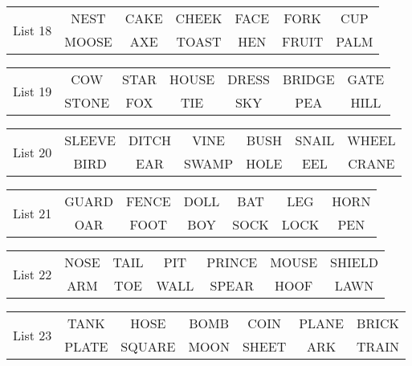\documentclass{article}
\begin{document}
\vspace{.1in}
\hspace{.5in}\begin{tabular}{r||c c c c c c }
\multirow{2}{*}{List 18} & NEST & CAKE & CHEEK & FACE & FORK & CUP\\
\cline{2-7}			& MOOSE & AXE & TOAST & HEN & FRUIT & PALM\\
\end{tabular}

\vspace{.1in}
\hspace{.5in}\begin{tabular}{r||c c c c c c }
\multirow{2}{*}{List 19} & COW & STAR & HOUSE & DRESS & BRIDGE & GATE\\
\cline{2-7}			& STONE & FOX & TIE & SKY & PEA & HILL\\
\end{tabular}

\vspace{.1in}
\hspace{.5in}\begin{tabular}{r||c c c c c c }
\multirow{2}{*}{List 20} & SLEEVE & DITCH & VINE & BUSH & SNAIL & WHEEL\\
\cline{2-7}			& BIRD & EAR & SWAMP & HOLE & EEL & CRANE\\
\end{tabular}

\vspace{.1in}
\hspace{.5in}\begin{tabular}{r||c c c c c c }
\multirow{2}{*}{List 21} & GUARD & FENCE & DOLL & BAT & LEG & HORN\\
\cline{2-7}			& OAR & FOOT & BOY & SOCK & LOCK & PEN\\
\end{tabular}

\vspace{.1in}
\hspace{.5in}\begin{tabular}{r||c c c c c c }
\multirow{2}{*}{List 22} & NOSE & TAIL & PIT & PRINCE & MOUSE & SHIELD\\
\cline{2-7}			& ARM & TOE & WALL & SPEAR & HOOF & LAWN\\
\end{tabular}

\vspace{.1in}
\hspace{.5in}\begin{tabular}{r||c c c c c c }
\multirow{2}{*}{List 23} & TANK & HOSE & BOMB & COIN & PLANE & BRICK\\
\cline{2-7}			& PLATE & SQUARE & MOON & SHEET & ARK & TRAIN\\
\end{tabular}
\end{document}
